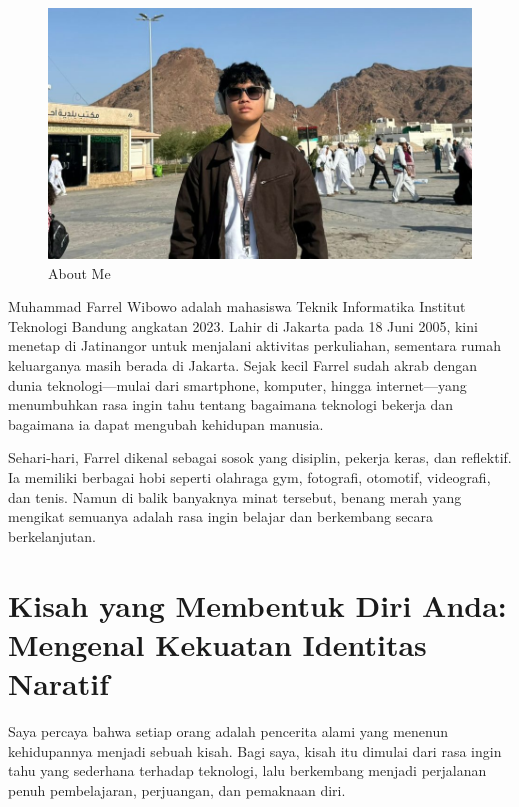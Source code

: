 \documentclass[
  letterpaper,
  DIV=11,
  numbers=noendperiod]{scrreprt}
\begin{document}
\begin{figure}[H]

{\centering \includegraphics[width=9.5\linewidth,height=\textheight,keepaspectratio]{All_About_me/../images/profile-pict.jpeg}

}

\caption{About Me}

\end{figure}%

Muhammad Farrel Wibowo adalah mahasiswa Teknik Informatika Institut
Teknologi Bandung angkatan 2023. Lahir di Jakarta pada 18 Juni 2005,
kini menetap di Jatinangor untuk menjalani aktivitas perkuliahan,
sementara rumah keluarganya masih berada di Jakarta. Sejak kecil Farrel
sudah akrab dengan dunia teknologi---mulai dari smartphone, komputer,
hingga internet---yang menumbuhkan rasa ingin tahu tentang bagaimana
teknologi bekerja dan bagaimana ia dapat mengubah kehidupan manusia.

Sehari-hari, Farrel dikenal sebagai sosok yang disiplin, pekerja keras,
dan reflektif. Ia memiliki berbagai hobi seperti olahraga gym,
fotografi, otomotif, videografi, dan tenis. Namun di balik banyaknya
minat tersebut, benang merah yang mengikat semuanya adalah rasa ingin
belajar dan berkembang secara berkelanjutan.

\section{\texorpdfstring{\textbf{Kisah yang Membentuk Diri Anda:
Mengenal Kekuatan Identitas
Naratif}}{Kisah yang Membentuk Diri Anda: Mengenal Kekuatan Identitas Naratif}}\label{kisah-yang-membentuk-diri-anda-mengenal-kekuatan-identitas-naratif}

Saya percaya bahwa setiap orang adalah pencerita alami yang menenun
kehidupannya menjadi sebuah kisah. Bagi saya, kisah itu dimulai dari
rasa ingin tahu yang sederhana terhadap teknologi, lalu berkembang
menjadi perjalanan penuh pembelajaran, perjuangan, dan pemaknaan diri.
\end{document}
